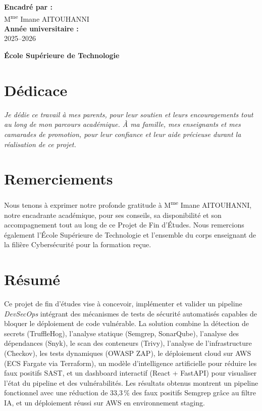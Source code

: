 \documentclass[12pt,a4paper]{report}
\begin{document}
\begin{titlepage}
\begin{center}
\begin{minipage}{0.85\textwidth}
            \textbf{\large Encadré par :}\\
            M\textsuperscript{me} Imane \textsc{AITOUHANNI}\\[1.5cm]

            \textbf{\large Année universitaire :}\\
            2025--2026
        \end{minipage}

        \vfill
        \textbf{\large \textcolor{primary}{École Supérieure de Technologie}}
    \end{center}
\end{titlepage}

\chapter*{Dédicace}
\textit{
Je dédie ce travail à mes parents, pour leur soutien et leurs encouragements tout au long de mon parcours académique. À ma famille, mes enseignants et mes camarades de promotion, pour leur confiance et leur aide précieuse durant la réalisation de ce projet.
}

\chapter*{Remerciements}
Nous tenons à exprimer notre profonde gratitude à M\textsuperscript{me} Imane \textsc{AITOUHANNI}, notre encadrante académique, pour ses conseils, sa disponibilité et son accompagnement tout au long de ce Projet de Fin d'Études. Nous remercions également l'École Supérieure de Technologie et l'ensemble du corps enseignant de la filière Cybersécurité pour la formation reçue.

\chapter*{Résumé}
Ce projet de fin d'études vise à concevoir, implémenter et valider un pipeline \textit{DevSecOps} intégrant des mécanismes de tests de sécurité automatisés capables de bloquer le déploiement de code vulnérable. La solution combine la détection de secrets (TruffleHog), l'analyse statique (Semgrep, SonarQube), l'analyse des dépendances (Snyk), le scan des conteneurs (Trivy), l'analyse de l'infrastructure (Checkov), les tests dynamiques (OWASP ZAP), le déploiement cloud sur AWS (ECS Fargate via Terraform), un modèle d'intelligence artificielle pour réduire les faux positifs SAST, et un dashboard interactif (React + FastAPI) pour visualiser l'état du pipeline et des vulnérabilités. Les résultats obtenus montrent un pipeline fonctionnel avec une réduction de 33,3\,\% des faux positifs Semgrep grâce au filtre IA, et un déploiement réussi sur AWS en environnement staging.
\end{document}
